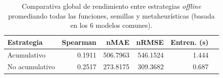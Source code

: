 \begin{table}[H]
    \centering
    \begin{tabular}{lrrrrr}
        \toprule
        \textbf{Estrategia} & \textbf{Spearman} & \textbf{nMAE} & \textbf{nRMSE} & \textbf{Entren. (s)} \\
        \midrule
        Acumulativo         & 0.1911            & 506.7963      & 546.1524       & 1.444                \\
        No acumulativo      & 0.2517            & 273.8175      & 309.3682       & 0.687                \\
        \bottomrule
    \end{tabular}
    \caption[Comparativa global de rendimiento entre estrategias \textit{offline}.]{Comparativa global de rendimiento entre estrategias \textit{offline} promediando todas las funciones, semillas y metaheurísticas (basada en los 6 modelos comunes).}
    \label{tab:comparativa_estrategias_offline}
\end{table}